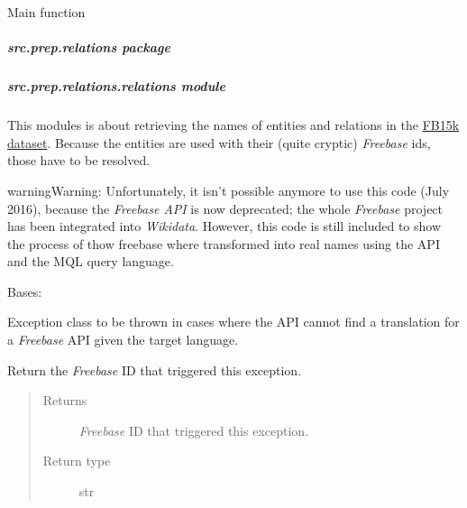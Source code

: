 \documentclass[letterpaper,10pt,english]{sphinxmanual}
\begin{document}

\begin{fulllineitems}
\label{src.prep.nes:src.prep.nes.statistics.main}
Main function

\end{fulllineitems}



\subparagraph{src.prep.relations package}
\label{src.prep.relations:src-prep-relations-package}\label{src.prep.relations::doc}

\subparagraph{src.prep.relations.relations module}
\label{src.prep.relations:src-prep-relations-relations-module}\label{src.prep.relations:module-src.prep.relations.relations}
This modules is about retrieving the names of entities and relations in the
\href{https://everest.hds.utc.fr/doku.php?id=en:smemlj12}{FB15k dataset}. Because the entities are
used with their (quite cryptic) \emph{Freebase} ids, those have to be resolved.

\begin{notice}{warning}{Warning:}
Unfortunately, it isn't possible anymore to use this code (July 2016), because the \emph{Freebase API} is now
deprecated; the whole \emph{Freebase} project has been integrated into \emph{Wikidata}. However, this code is still
included to show the process of thow freebase where transformed into real names using the API and the MQL query
language.
\end{notice}

\begin{fulllineitems}
\label{src.prep.relations:src.prep.relations.relations.MissingTranslationException}
Bases: 

Exception class to be thrown in cases where the API cannot find a translation for a \emph{Freebase} API given the
target language.

\begin{fulllineitems}
\label{src.prep.relations:src.prep.relations.relations.MissingTranslationException.get_id}
Return the \emph{Freebase} ID that triggered this exception.
\begin{quote}\begin{description}
\item[{Returns}] \leavevmode
\emph{Freebase} ID that triggered this exception.

\item[{Return type}] \leavevmode
str

\end{description}\end{quote}

\end{fulllineitems}


\end{fulllineitems}
\end{document}
